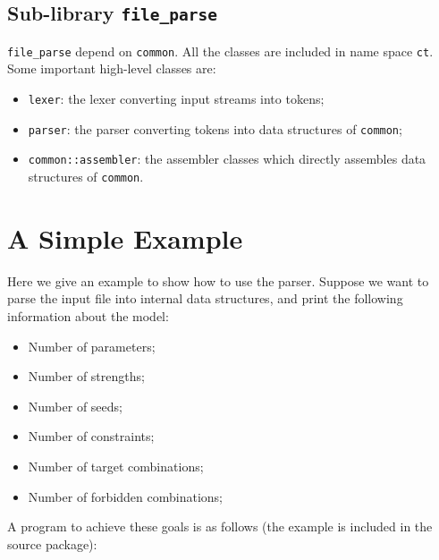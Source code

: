 \documentclass{article}
\begin{document}
\subsection{Sub-library {\tt file\_parse}}
{\tt file\_parse} depend on {\tt common}. All the classes are included in name space {\tt ct}.
Some important high-level classes are:
\begin{itemize}
\item {\tt lexer}: the lexer converting input streams into tokens;
\item {\tt parser}: the parser converting tokens into data structures of {\tt common};
\item {\tt common::assembler}: the assembler classes which directly assembles data structures of
    {\tt common}.
\end{itemize}

\section{A Simple Example}
Here we give an example to show how to use the parser.
Suppose we want to parse the input file into internal data structures,
and print the following information about the model:
\begin{itemize}
\item Number of parameters;
\item Number of strengths;
\item Number of seeds;
\item Number of constraints;
\item Number of target combinations;
\item Number of forbidden combinations;
\end{itemize}

A program to achieve these goals is as follows (the example is included in the source package):
\end{document}
